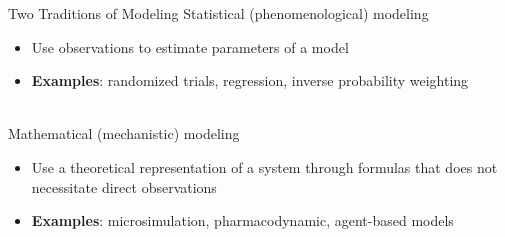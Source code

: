 \documentclass[aspectratio=169]{beamer}
\begin{document}
\begin{frame}{Two Traditions of Modeling}
	Statistical (phenomenological) modeling
	\begin{itemize}
		\item Use observations to estimate parameters of a model
		\item \textbf{Examples}: randomized trials, regression, inverse probability weighting
	\end{itemize}
	~\\
	Mathematical (mechanistic) modeling
	\begin{itemize}
		\item Use a theoretical representation of a system through formulas that does not necessitate direct observations
		\item \textbf{Examples}: microsimulation, pharmacodynamic, agent-based models
	\end{itemize}
\end{frame}


\end{document}
